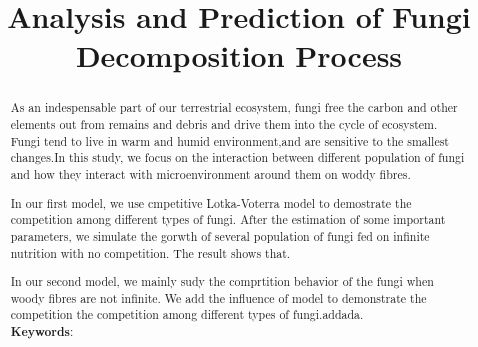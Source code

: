 \documentclass[12pt]{article}
\title{Analysis and Prediction of Fungi Decomposition Process}
\begin{document}
	\begin{abstract}
		As an indespensable part of our terrestrial ecosystem, fungi free the carbon and other elements out from remains and debris and drive them into the cycle of ecosystem. Fungi tend to live in warm and humid environment,and are sensitive to the smallest changes.In this study, we focus on the interaction between different population of fungi and how they interact with microenvironment around them on woddy fibres. 

		In our first model, we use cmpetitive Lotka-Voterra model to demostrate the competition among different types of fungi. After the estimation of some important parameters, we simulate the gorwth of several population of  fungi  fed on infinite nutrition with no competition. The result shows that.
		
		In our second model, we mainly sudy the comprtition behavior of the fungi when woody fibres are not infinite. We add the influence of model to demonstrate the competition the competition among different types of fungi.addada. \\
		\vspace{5pt}
		\textbf{Keywords}:
	\end{abstract}
	
	\maketitle
	\tableofcontents
	
	
	
	
	
	
	
	
	
\end{document}
